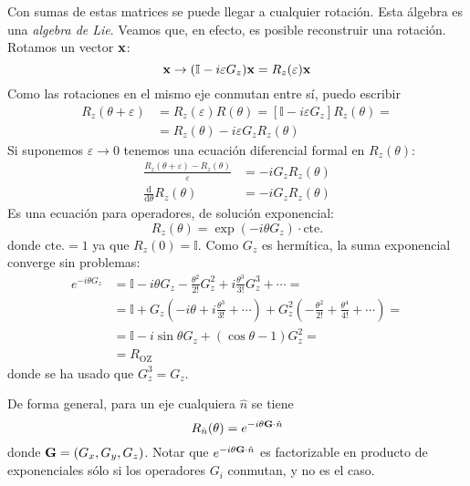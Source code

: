 Con sumas de estas matrices se puede llegar a cualquier rotación.
Esta álgebra es una \emph{algebra de Lie}. Veamos que, en efecto, es
posible reconstruir una rotación. Rotamos un vector $\bm{\mathrm{x}}$:
\begin{equation}
  \bm{\mathrm{x}} \to (\mathbb{I}-i\varepsilon G_z)\bm{\mathrm{x}} = R_z(\varepsilon)\bm{\mathrm{x}}
\end{equation}
Como las rotaciones en el mismo eje conmutan entre sí, puedo escribir
\begin{equation}
  \begin{split}
    R_z(\theta+\varepsilon) &= R_z(\varepsilon)R(\theta) = [\mathbb{I} -
    i\varepsilon G_z] R_z(\theta) =\\
    &= R_z(\theta) - i\varepsilon G_z R_z(\theta)
  \end{split}
\end{equation}
Si suponemos $\varepsilon \to 0$ tenemos una ecuación diferencial formal
en $R_z(\theta)$:
\begin{align}
  \frac{R_z(\theta+\varepsilon) - R_z(\theta)}{\varepsilon} &= - i
  G_z R_z(\theta) \\
  \frac{\text{d}}{\text{d}\theta}R_z(\theta) &= -i G_z R_z(\theta)
\end{align}
Es una ecuación para operadores, de solución exponencial:
\begin{equation}
  R_z(\theta) = \exp(-i\theta G_z)\cdot \text{cte.}
\end{equation}
donde $\text{cte.} =1$ ya que $R_z(0) = \mathbb{I}$. Como $G_z$ es
hermítica, la suma exponencial converge sin problemas:
\begin{equation}
  \begin{split}
    e^{-i\theta G_z} &= \mathbb{I}-i \theta G_z -
    \frac{\theta^2}{2!}G_z^2 + i \frac{\theta^3}{3!} G_z^3 + \cdots =
    \\
    &= \mathbb{I} + G_z \left( -i\theta + i \frac{\theta^3}{3!} +
      \cdots \right) + G_z^2 \left( - \frac{\theta^2}{2!} +
      \frac{\theta^4}{4!} + \cdots \right) =\\
    &= \mathbb{I} - i \sin \theta G_z + (\cos\theta -1)G_z^2 = \\
    &= R_{\text{OZ}}
  \end{split}
\end{equation}
donde se ha usado que $G_z^3 = G_z$.

De forma general, para un eje cualquiera $\hat{n}$ se tiene
\begin{equation}
  R_{\hat{n}}(\theta) = e^{-i\theta \bm{\mathrm{G}}\cdot \hat{n}}
\end{equation}
donde $\bm{\mathrm{G}} = (G_x,G_y,G_z)$. Notar que $e^{-i\theta
  \bm{\mathrm{G}}\cdot \hat{n}} $ es factorizable en producto de
exponenciales sólo si los operadores $G_i$ conmutan, y
no es el caso.

